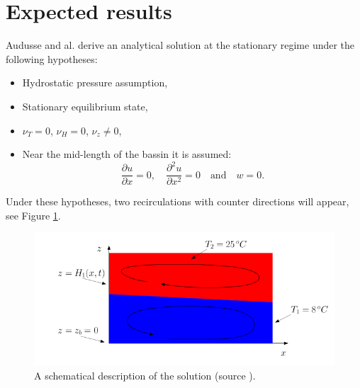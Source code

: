 \section{Expected results}
%
%

Audusse and al. \cite{Audusse2011} derive an analytical solution at the
stationary regime under the following hypotheses:
\begin{itemize}
\item Hydrostatic pressure assumption,
\item Stationary equilibrium state,
\item $\nu_T = 0$, $\nu_H = 0$, $\nu_z \neq 0$,
\item Near the mid-length of the bassin it is assumed:
  \begin{equation}
  \frac{\partial u}{\partial x} =0, \quad \frac{\partial^2 u}{\partial x^2} =0 \quad \textrm{and} \quad w = 0.
  \end{equation}
\end{itemize}

Under these hypotheses, two recirculations with counter directions will appear,
see Figure \ref{fig:stratif_wind:scheme}.

\begin{figure}[H]
  \begin{center}
    \includegraphics[width=15cm]{img/vent_ref}
    \caption{A schematical description of the solution (source \cite{Abbas2015}).}
    \label{fig:stratif_wind:scheme}
  \end{center}
\end{figure}

